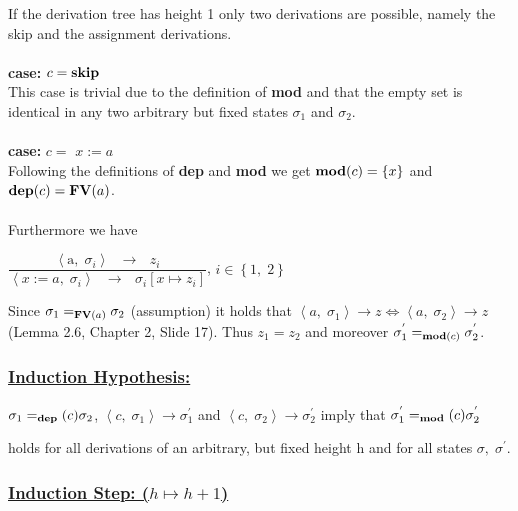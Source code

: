 \documentclass[12pt]{scrartcl}
\newcommand{\eRelation}[2]{$\dfrac{\text{#1}}{\text{#2}}$}
\newcommand{\eState}[2]{$\left\langle \text{#1},\; \text{#2}\right\rangle$}
\newcommand{\eRule}[3]{\eState{#1}{#2} $\rightarrow$ #3}
\newcommand{\Mod}[0]{\text{\textbf{mod}}}
\newcommand{\dep}[0]{\text{\textbf{dep}}}
\newcommand{\FV}[0]{\text{\textbf{FV}}}
\begin{document}
	\indent\indent If the derivation tree has height 1 only two derivations are possible, namely \indent the skip and the assignment derivations.\\\\
	\indent \textbf{case:} $c=\text{\textbf{skip}}$\\
	\indent\indent This case is trivial due to the definition of \textbf{mod} and that the empty set is \indent\indent identical in any two arbitrary but fixed states $\sigma_{1}$ and $\sigma_{2}$.\\\\
	\indent \textbf{case:} $c=$ {\boldmath$x:=a$}\\
	\indent\indent Following the definitions of \textbf{dep} and \textbf{mod} we get $\Mod(c)=\left\lbrace x\right\rbrace$ and \indent\indent $\dep(c)=\FV(a)$.\\\\
	\indent\indent Furthermore we have
	\begin{center}
		\eRelation
			{\eRule{a}{$\sigma_{i}$}{$z_{i}$}}
			{\eRule{$x:=a$}{$\sigma_{i}$}{$\sigma_{i}\left[ x\mapsto z_{i}\right]$}}, $i\in \left\lbrace 1,\; 2\right\rbrace$\\
	\end{center}
	\indent\indent\indent Since $\sigma_{1}=_{\FV(a)}\sigma_{2}$ (assumption) it holds that $\left\langle a,\; \sigma_{1}\right\rangle\rightarrow z \Leftrightarrow \left\langle a,\; \sigma_{2}\right\rangle\rightarrow z$ \indent\indent(Lemma 2.6, Chapter 2, Slide 17). Thus $z_{1}=z_{2}$ and moreover $\sigma^{'}_{1}=_{\Mod(c)}\sigma^{'}_{2}$.
	
	\subsubsection*{\underline{Induction Hypothesis:}}
	
	\begin{center}
		$\sigma_{1} =_\dep(c) \sigma_{2}$, $\left\langle c,\; \sigma_{1} \right\rangle \rightarrow \sigma^{'}_{1}$ and $\left\langle c, \; \sigma_{2}\right\rangle \rightarrow \sigma^{'}_{2}$ imply that $\sigma^{'}_{1} =_\Mod(c)\sigma^{'}_{2}$
	\end{center}
	\indent\indent holds for all derivations of an arbitrary, but fixed height h and for all states \indent$\sigma,\; \sigma^{'}$.
	
	\subsubsection*{\underline{Induction Step: ({\boldmath$h\mapsto h+1$})}}
	
\end{document}
